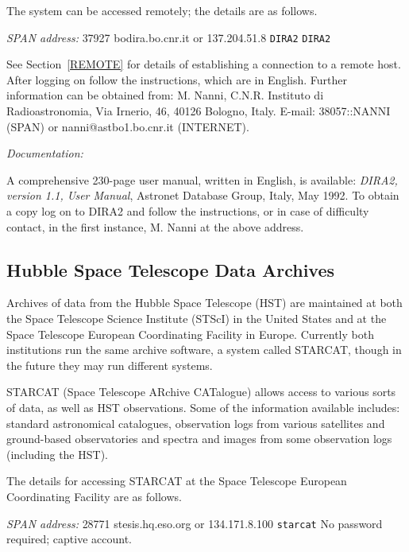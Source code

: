 The system can be accessed remotely; the details are as follows.

{\it SPAN address: } 37927
 bodira.bo.cnr.it or 137.204.51.8
 \verb-DIRA2-
 \verb-DIRA2-

See Section~\ref{REMOTE} for details of establishing a connection to
a remote host. After logging on follow the instructions, which are in 
English. Further information can be obtained from: M. Nanni, C.N.R. 
Instituto di Radioastronomia, Via Irnerio, 46, 40126 Bologno, Italy. 
E-mail: 38057::NANNI (SPAN) or nanni@astbo1.bo.cnr.it (INTERNET).

{\it Documentation:}

A comprehensive 230-page user manual, written in English, is available:
{\it DIRA2, version 1.1, User Manual}, Astronet Database Group, Italy,
May 1992. To obtain a copy log on to DIRA2 and follow the instructions,
or in case of difficulty contact, in the first instance, M. Nanni at
the above address.

\subsection{Hubble Space Telescope Data Archives
}

Archives of data from the Hubble Space Telescope (HST) are maintained at
both the Space Telescope Science Institute (STScI) in the United States
and at the Space Telescope European Coordinating Facility in Europe. 
Currently both institutions run the same archive software, a system 
called STARCAT, though in the future they may run different systems.

STARCAT (Space Telescope ARchive CATalogue) allows access to various
sorts of data, as well as HST observations. Some of the information
available includes: standard astronomical catalogues, observation logs
from various satellites and ground-based observatories and spectra
and images from some observation logs (including the HST).

The details for accessing STARCAT at the Space Telescope European 
Coordinating Facility are as follows.

{\it SPAN address: } 28771
 stesis.hq.eso.org or 134.171.8.100
 \verb-starcat-
 No password required; captive account.

